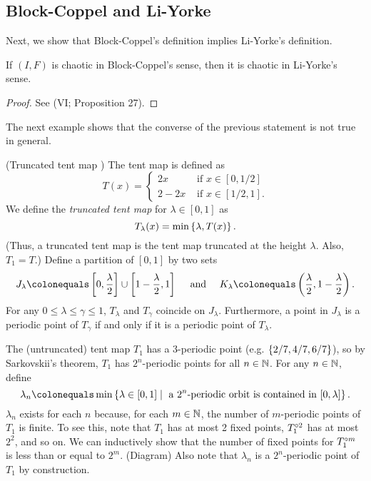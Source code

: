 \documentclass[12pt,twoside,draft]{book}
\begin{document}
\subsection*{Block-Coppel and Li-Yorke}
Next, we show that Block-Coppel's definition implies Li-Yorke's definition.
\begin{theorem}
  \citep{blockcoppel}
  If $(I,F)$ is chaotic in Block-Coppel's sense, then it is chaotic in Li-Yorke's sense.
  \label{thm:devaney-liyorke}
  \begin{proof}
    See \citet{blockcoppel} (VI; Proposition 27).
  \end{proof}
\end{theorem}
The next example shows that the converse of the previous statement is not true in general.
\begin{example}
  (Truncated tent map \citep{aulbach})
  The tent map is defined as
  \begin{equation*}
    T(x) = 
    \begin{cases}
      2x     &\mbox{ if } x \in [0,1/2] \\
      2 - 2x &\mbox{ if } x \in [1/2,1].
    \end{cases}
  \end{equation*}
  We define the \textit{truncated tent map} for $\lambda \in [0,1]$ as 
  \begin{equation*}
    T_\lambda(x) = \min\left \{ \lambda, T(x) \right \}.
  \end{equation*}
  (Thus, a truncated tent map is the tent map truncated at the height $\lambda$.
  Also, $T_1 = T$.)
  Define a partition of $[0,1]$ by two sets
  \begin{equation*}
    J_\lambda \ceq \brac{0, \frac{\lambda}{2}} \cup \brac{1 - \frac{\lambda}{2}, 1} 
    \quad\mbox{ and }\quad
    K_\lambda \ceq \paren{\frac{\lambda}{2}, 1- \frac{\lambda}{2}}.
  \end{equation*}
  For any $0 \leq \lambda \leq \gamma \leq 1$, $T_\lambda$ and $T_\gamma$ coincide on $J_\lambda$.
  Furthermore, a point in $J_\lambda$ is a periodic point of $T_\gamma$ if and only if it is a periodic point of $T_\lambda$.

  The (untruncated) tent map $T_1$ has a 3-periodic point (e.g. $\left \{ 2/7, 4/7, 6/7 \right \}$), so by Sarkovskii's theorem, $T_1$ has $2^n$-periodic points for all $n \in \mathbb{N}$.
  For any $n \in \mathbb{N}$, define
  \begin{equation*}
    \lambda_n \ceq \min\setst{\lambda \in [0,1]}{\mbox{ a } 2^n\mbox{-periodic orbit is contained in } [0,\lambda]}.
  \end{equation*}
  $\lambda_n$ exists for each $n$ because, for each $m \in \mathbb{N}$, the number of $m$-periodic points of $T_1$ is finite.
  To see this, note that $T_1$ has at most 2 fixed points, $T_1^{\circ 2}$ has at most $2^2$, and so on. 
  We can inductively show that the number of fixed points for $T_1^{\circ m}$ is less than or equal to $2^m$. (Diagram)
  Also note that $\lambda_n$ is a $2^n$-periodic point of $T_1$ by construction.


\end{example}
\end{document}
